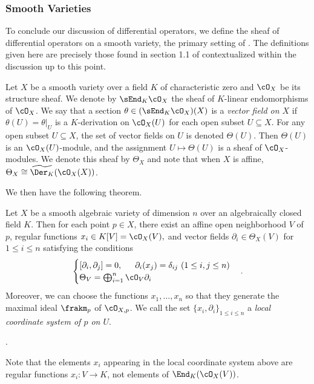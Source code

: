 \subsubsection{Smooth Varieties}
To conclude our discussion of differential operators, we define the sheaf of differential operators on a smooth variety, the primary setting of \cite{d-mod_ps-rt}. The definitions given here are precisely those found in section 1.1 of \cite{d-mod_ps-rt} contextualized within the discussion up to this point.

\begin{defn}\label{defn:diff-ops-on-variety}
	Let $X$ be a smooth variety over a field $K$ of characteristic zero and $\cO_X$ be its structure sheaf. We denote by $\sEnd_K\cO_X$ the sheaf of $K$-linear endomorphisms of $\cO_X$. We say that a section $\theta \in (\sEnd_K\cO_X)(X)$ is a \emph{vector field on $X$} if $\theta(U) = \theta|_U$ is a $K$-derivation on $\cO_X(U)$ for each open subset $U \subseteq X$. For any open subset $U \subseteq X$, the set of vector fields on $U$ is denoted $\Theta(U)$. Then $\Theta(U)$ is an $\cO_X(U)$-module, and the assignment $U\mapsto \Theta(U)$ is a sheaf of $\cO_X$-modules. We denote this sheaf by $\Theta_X$ and note that when $X$ is affine, $\Theta_X \cong \widetilde{\Der_K}(\cO_X(X))$.
\end{defn}
We then have the following theorem.
\begin{thm}\label{thm:sheaf-of-vector-fields}
	Let $X$ be a smooth algebraic variety of dimension $n$ over an algebraically closed field $K$. Then for each point $p \in X$, there exist an affine open neighborhood $V$ of $p$, regular functions $x_i \in K[V] = \cO_X(V),$ and vector fields $\partial_i \in \Theta_X(V)$ for $1\leq i\leq n$ satisfying the conditions
	\begin{align*}
		\begin{cases}
		    [\partial_i,\partial_j] = 0, \hspace{1.5em} \partial_i(x_j) = \delta_{ij} ~ (1\leq i, j\leq n) \\
			\Theta_V = \bigoplus_{i=1}^n \cO_V \partial_i
		\end{cases}.
	\end{align*}
	Moreover, we can choose the functions $x_1,...,x_n$ so that they generate the maximal ideal $\frakm_p$ of $\cO_{X,p}$. We call the set $\{x_i,\partial_i\}_{1\leq i\leq n}$ a \emph{local coordinate system of $p$ on $U$}.
\end{thm}
\begin{prf}
	{\cite[Theorem A.5.1]{d-mod_ps-rt}}.
\end{prf}
Note that the elements $x_i$ appearing in the local coordinate system above are regular functions $x_i:V \to K$, not elements of $\End_K(\cO_X(V))$.

